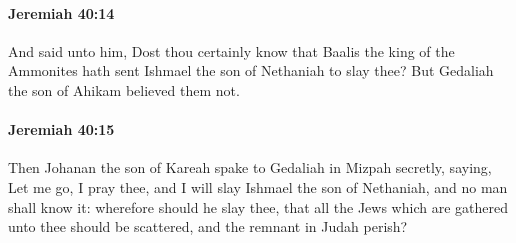 		\paragraph{Jeremiah 40:14} %
			\label{JEREMIAH-40-14}

			And said unto him, Dost thou certainly know that Baalis the king of the Ammonites hath sent Ishmael the son of Nethaniah to slay thee? But Gedaliah the son of Ahikam believed them not.


		\paragraph{Jeremiah 40:15} %
			\label{JEREMIAH-40-15}

			Then Johanan the son of Kareah spake to Gedaliah in Mizpah secretly, saying, Let me go, I pray thee, and I will slay Ishmael the son of Nethaniah, and no man shall know it: wherefore should he slay thee, that all the Jews which are gathered unto thee should be scattered, and the remnant in Judah perish?

